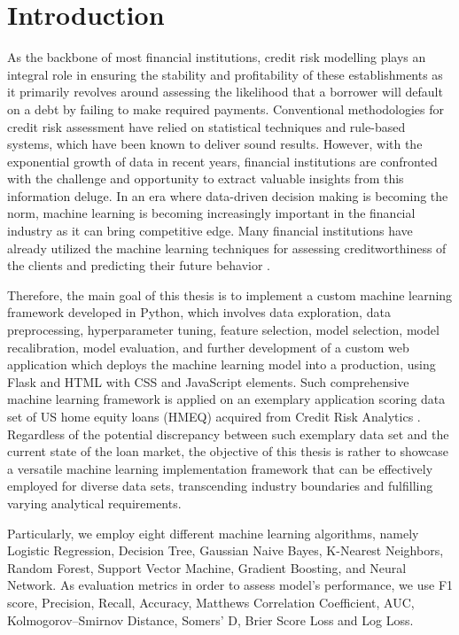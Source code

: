 \chapter{Introduction}
\label{chap:one}

As the backbone of most financial institutions, credit risk modelling plays an integral role in ensuring the stability and profitability of these establishments as it primarily revolves around assessing the likelihood that a borrower will default on a debt by failing to make required payments.
Conventional methodologies for credit risk assessment have relied on statistical techniques and rule-based systems, which have been known to deliver sound results.
However, with the exponential growth of data in recent years, financial institutions are confronted with the challenge and opportunity to extract valuable insights from this information deluge.
In an era where data-driven decision making is becoming the norm, machine learning is becoming increasingly important in the financial industry as it can bring competitive edge. Many financial institutions have already utilized the machine learning techniques for assessing creditworthiness of the clients and predicting their future behavior \citep{PwC2023}.


Therefore, the main goal of this thesis is to implement a custom machine learning framework developed in Python, which involves data exploration, data preprocessing, hyperparameter tuning, feature selection, model selection, model recalibration, model evaluation, and further development of a custom web application which deploys the machine learning model into a production, using Flask and HTML with CSS and JavaScript elements.
Such comprehensive machine learning framework is applied on an exemplary application scoring data set of US home equity loans (HMEQ) acquired from Credit Risk Analytics \citep{baesens2016credit}.
Regardless of the potential discrepancy between such exemplary data set and the current state of the loan market, the objective of this thesis is rather to showcase a versatile machine learning implementation framework that can be effectively employed for diverse data sets, transcending industry boundaries and fulfilling varying analytical requirements.


Particularly, we employ eight different machine learning algorithms, namely Logistic Regression, Decision Tree, Gaussian Naive Bayes, K-Nearest Neighbors, Random Forest, Support Vector Machine, Gradient Boosting, and Neural Network.
As evaluation metrics in order to assess model's performance, we use F1 score, Precision, Recall, Accuracy, Matthews Correlation Coefficient, AUC, Kolmogorov--Smirnov Distance, Somers' D, Brier Score Loss and Log Loss.


